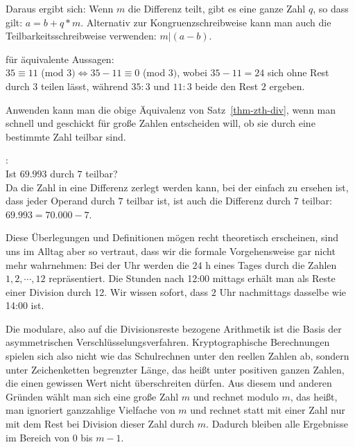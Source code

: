 \begin{refsegment}
Daraus ergibt sich: Wenn $m$ die Differenz teilt, gibt es eine ganze Zahl $q$, so
dass gilt: $a = b + q*m$.
Alternativ zur Kongruenzschreibweise kann man auch die Teilbarkeitsschreibweise
verwenden: $m | (a - b)$.\\

\begin{example}{ für äquivalente Aussagen:}\\
$35 \equiv 11$ (mod $3) \Longleftrightarrow  35 - 11 \equiv 0$ (mod $3)$,
wobei $35 - 11 = 24$ sich ohne Rest durch $3$ teilen lässt, während $35:3$ und
$11:3$ beide den Rest $2$ ergeben.
\end{example}


Anwenden kann man die obige Äquivalenz von Satz~\ref{thm-zth-div}, wenn man schnell
und geschickt für große Zahlen entscheiden will, ob sie durch eine bestimmte
Zahl teilbar sind.

\begin{example}{:}\\
Ist $69.993$ durch $7$ teilbar?\\
Da die Zahl in eine Differenz zerlegt werden kann, bei der einfach zu ersehen
ist, dass jeder Operand durch $7$ teilbar ist, ist auch die Differenz durch $7$
teilbar: $69.993 = 70.000 - 7$.\\
\end{example}

Diese Überlegungen und Definitionen mögen recht theoretisch erscheinen, sind
uns im Alltag aber so vertraut, dass wir die formale Vorgehensweise gar nicht
mehr wahrnehmen: Bei der Uhr werden die $24$ h eines Tages durch die Zahlen
$1, 2, \cdots, 12$ repräsentiert. Die Stunden nach 12:00 mittags erhält man als
Reste einer Division durch 12. Wir wissen sofort, dass $2$ Uhr nachmittags
dasselbe wie 14:00 ist.

Die \glqq modulare\grqq, also auf die Divisionsreste bezogene Arithmetik ist die
Basis der asymmetrischen Verschlüsselungsverfahren.
Kryptographische Berechnungen spielen sich also nicht wie das Schulrechnen
unter den reellen Zahlen ab, sondern unter Zeichenketten begrenzter Länge,
das heißt unter positiven ganzen Zahlen, die einen gewissen Wert nicht
überschreiten dürfen.
Aus diesem und anderen Gründen wählt man sich eine große Zahl $m$ und \glqq rechnet
modulo $m$\grqq, das heißt, man ignoriert ganzzahlige Vielfache von $m$ und rechnet
statt mit einer Zahl nur mit dem Rest bei Division dieser Zahl durch $m$.
Dadurch bleiben alle Ergebnisse im Bereich von $0$ bis $m-1$.



\end{refsegment}

